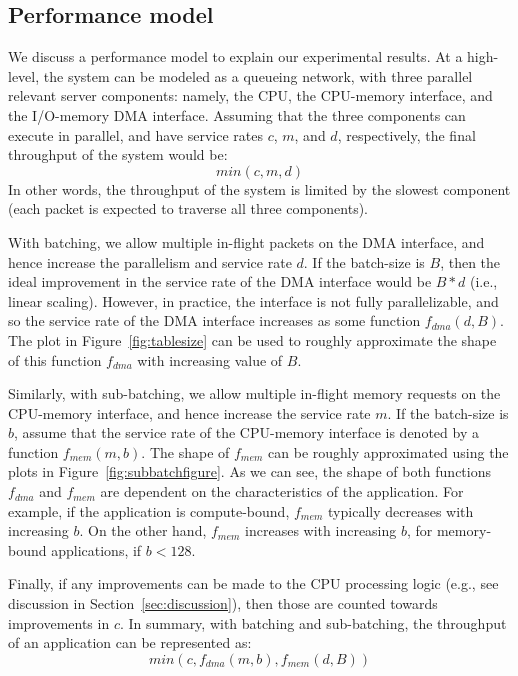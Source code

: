 \subsection{Performance model}
We discuss a performance model to explain our experimental results. At a high-level,
the system can be modeled as a queueing network, with three parallel relevant
server components: namely,
the CPU, the CPU-memory interface, and the I/O-memory DMA interface. Assuming that
the three components
can execute in parallel, and have service rates $c$, $m$, and $d$, respectively, the
final throughput of the system would be:
$$
min(c, m, d)
$$
In other words, the throughput of the system is limited by the slowest component (each
packet is expected to traverse all three components).

With batching, we allow multiple in-flight packets on the DMA interface, and
hence increase the parallelism and service rate $d$. If the batch-size is $B$, then
the ideal improvement in the service rate of the DMA interface would be $B*d$ (i.e., linear
scaling).
However, in practice,
the interface is not fully parallelizable, and so the service rate of
the DMA interface increases as some function $f_{dma}(d, B)$. The plot in Figure~\ref{fig:tablesize}
can be used to roughly approximate the shape of this function $f_{dma}$ with increasing value of $B$.

Similarly, with sub-batching, we allow multiple in-flight memory requests on the
CPU-memory interface, and hence increase the service rate $m$. If the batch-size is $b$,
assume that the service rate of the CPU-memory interface is denoted by
a function $f_{mem}(m, b)$. The shape of $f_{mem}$ can be roughly approximated using
the plots in Figure~\ref{fig:subbatchfigure}. As we can see, the shape of both functions $f_{dma}$
and $f_{mem}$ are dependent on the characteristics of the application. For example,
if the application is compute-bound, $f_{mem}$ typically decreases with increasing $b$.
On the other hand, $f_{mem}$ increases with increasing $b$, for memory-bound applications,
if $b<128$.

Finally, if any improvements can be made to the CPU processing logic (e.g., see discussion
in Section~\ref{sec:discussion}), then those
are counted towards improvements in $c$. In summary, with batching and sub-batching, the
throughput of an application can be represented as:
$$
min(c, f_{dma}(m, b), f_{mem}(d, B))
$$


